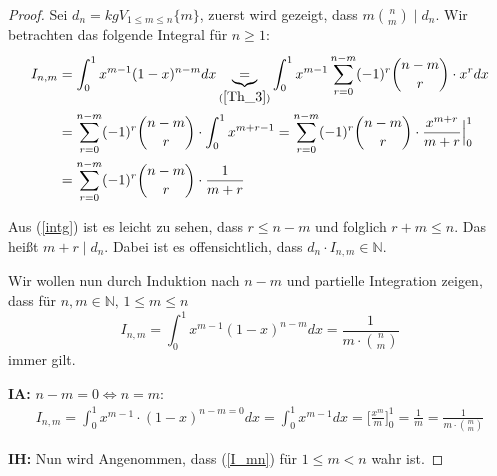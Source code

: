 \documentclass[12pt,oneside]{article}
\theoremstyle{remark}
\theoremstyle{definition}
\begin{document}
\begin{proof}
Sei $d_{n} = kgV_{1 \leq m \leq n}{\{m\}}$, zuerst wird  gezeigt, dass $m {n \choose m} \mid d_n$.\newline 
Wir betrachten das folgende Integral für $n \geq 1$:\newline
\begin{equation}\label{intg}
    \begin{split}
      \begin{aligned}
        I_{n,m}&= \int_{0}^{1} x^{m-1} (1-x)^{n - m} dx \underbrace{=}_{(\ref{Th_3})} \int_{0}^{1} x^{m-1} \sum_{r = 0}^{n - m} (-1)^r {n - m\choose r} \cdot x^r dx \\
        &= \sum_{r = 0}^{n - m}(-1)^r {n - m \choose r} \cdot \int_{0}^{1} x^{m + r - 1} 
        = \sum_{r = 0}^{n - m} (-1)^r {n - m \choose r} \cdot \frac{x^{m+r}}{m+r}\Big|_0^1\\
        &= \sum_{r = 0}^{n - m} (-1)^r {n - m \choose r} \cdot \frac{1}{m + r}
      \end{aligned}
    \end{split}
\end{equation}

Aus (\ref{intg}) ist es leicht zu sehen, dass $r \leq n - m $ und folglich $ r + m \leq n $. Das heißt $m + r \mid d_{n}$. Dabei ist es offensichtlich, dass $d_{n} \cdot I_{n,m} \in \mathbb{N}$.\newline\newline

Wir wollen nun durch Induktion nach $n - m$ und partielle Integration zeigen, dass für $n,m \in \mathbb{N}, \, 1 \leq  m \leq n$
\begin{equation}\label{I_mn}
    I_{n,m} = \int_{0}^{1} x^{m-1} (1-x)^{n - m} dx = \frac{1}{m \cdot {n \choose m}}
\end{equation}
immer gilt.\newline\newline


\textbf{IA:}
$n - m = 0 \iff n = m $:
\begin{align*}
    I_{n,m} =  \int_{0}^{1} x^{m - 1 } \cdot (1-x)^{n - m = 0} dx = \int_{0}^{1} x^{m - 1} dx = \Big[ \frac{x^m}{m}\Big]_0^1 = \frac{1}{m} = \frac{1}{m \cdot {m \choose m}}
\end{align*}

\textbf{IH:}
Nun wird Angenommen, dass (\ref{I_mn}) für $ 1 \leq m < n$ wahr ist.\newline\newline


\end{proof}
\end{document}

